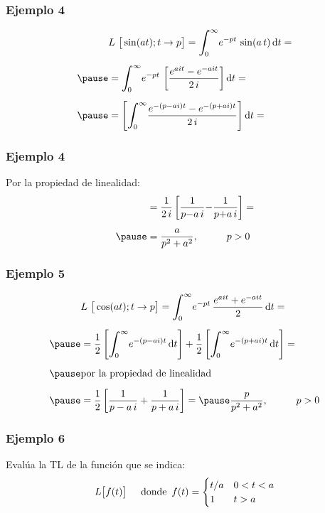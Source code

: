 \begin{frame}
\frametitle{Ejemplo 4}
\begin{eqnarray*}
\begin{aligned}
&L \big[  \sin (a t); t \to p  \big] = \scaleint{6ex}_{\bs 0}^{\infty} e^{-p t} \, \sin (a \, t) \dd{t} = \\[0.5em] \pause
&= \scaleint{6ex}_{\bs 0}^{\infty} e^{-p t} \,\left[ \dfrac{e^{a i t} - e^{- a i t}}{2 \, i} \right] \dd{t} = \\[0.5em] \pause
&= \left[ \scaleint{6ex}_{\bs 0}^{\infty}  \dfrac{e^{-(p - a i) t} - e^{- (p + a i) t}}{2 \, i} \right] \dd{t} = 
\end{aligned}
\end{eqnarray*}
\end{frame}
\begin{frame}
\frametitle{Ejemplo 4}
Por la propiedad de linealidad:
\pause
\begin{eqnarray*}
\begin{aligned}    
&= \dfrac{1}{2 \, i} \left[ \dfrac{1}{p {-} a \, i} {-} \dfrac{1}{p {+} a \, i} \right] = \\[0.5em] \pause
&= \dfrac{a}{p^{2} + a^{2}}, \hspace{1cm} p > 0
\end{aligned}
\end{eqnarray*}
\end{frame}
\begin{frame}
\frametitle{Ejemplo 5}
\begin{eqnarray*}
\begin{aligned}
&L \big[  \cos (a t); t \to p  \big] = \scaleint{6ex}_{\bs 0}^{\infty} e^{-p t} \,\dfrac{e^{a i t} + e^{- a i t}}{2} \dd{t} = \\[0.5em] \pause
&= \dfrac{1}{2} \left[ \scaleint{6ex}_{\bs 0}^{\infty} e^{-(p - a i) t} \dd{t} \right] + \dfrac{1}{2} \left[ \scaleint{6ex}_{\bs 0}^{\infty} e^{-(p + a i) t} \dd{t} \right] = \\[0.5em] \pause
&\mbox{por la propiedad de linealidad  } \\[0.5em] \pause
&= \dfrac{1}{2} \left[ \dfrac{1}{p - a \, i} + \dfrac{1}{p + a \, i}\right] = \pause \dfrac{p}{p^{2} + a^{2}}, \hspace{1cm} p > 0
\end{aligned}
\end{eqnarray*}
\end{frame}
\begin{frame}
\frametitle{Ejemplo 6}
Evalúa la TL de la función que se indica:
\pause
\begin{align*}
L \big[  f (t)  \big] \hspace{0.5cm} \mbox{donde} \hspace{0.5em} f (t) = \begin{cases}
t/a & 0 < t < a \\
1 & t > a
\end{cases}
\end{align*}
\end{frame}
